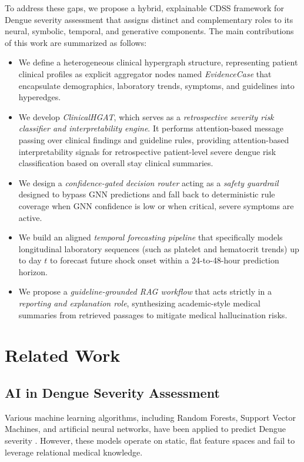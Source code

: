 \documentclass[conference]{IEEEtran}
\begin{document}
To address these gaps, we propose a hybrid, explainable CDSS framework for Dengue severity assessment that assigns distinct and complementary roles to its neural, symbolic, temporal, and generative components. The main contributions of this work are summarized as follows:
\begin{itemize}
    \item We define a heterogeneous clinical hypergraph structure, representing patient clinical profiles as explicit aggregator nodes named \textit{EvidenceCase} that encapsulate demographics, laboratory trends, symptoms, and guidelines into hyperedges.
    \item We develop \textit{ClinicalHGAT}, which serves as a \textit{retrospective severity risk classifier and interpretability engine}. It performs attention-based message passing over clinical findings and guideline rules, providing attention-based interpretability signals for retrospective patient-level severe dengue risk classification based on overall stay clinical summaries.
    \item We design a \textit{confidence-gated decision router} acting as a \textit{safety guardrail} designed to bypass GNN predictions and fall back to deterministic rule coverage when GNN confidence is low or when critical, severe symptoms are active.
    \item We build an aligned \textit{temporal forecasting pipeline} that specifically models longitudinal laboratory sequences (such as platelet and hematocrit trends) up to day $t$ to forecast future shock onset within a 24-to-48-hour prediction horizon.
    \item We propose a \textit{guideline-grounded RAG workflow} that acts strictly in a \textit{reporting and explanation role}, synthesizing academic-style medical summaries from retrieved passages to mitigate medical hallucination risks.
\end{itemize}

\section{Related Work}
\label{sec:related}
\subsection{AI in Dengue Severity Assessment}
Various machine learning algorithms, including Random Forests, Support Vector Machines, and artificial neural networks, have been applied to predict Dengue severity \cite{cdss_dengue}. However, these models operate on static, flat feature spaces and fail to leverage relational medical knowledge.
\end{document}
